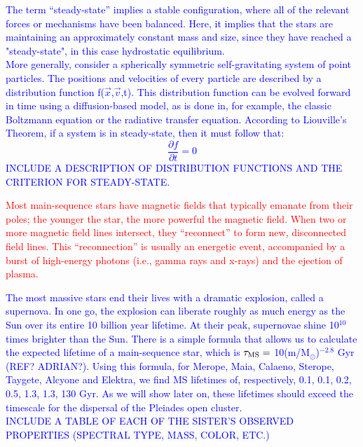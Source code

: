 \documentclass[main.tex]{subfiles}
\begin{document}
\begin{tcolorbox}[sharp corners, colback=blue!30, colframe=blue!80!blue, title=Steady-State$^{20}$]
\par \textcolor{blue} {The term ``steady-state'' implies a stable configuration, where all of the relevant forces or mechanisms have been balanced.  Here, it implies that the stars are maintaining an approximately constant mass and size, since they have reached a "steady-state", in this case hydrostatic equilibrium. \\
More generally, consider a spherically symmetric self-gravitating system of point particles.  The positions and velocities of every particle are described by a distribution function f($\vec{x}$,$\vec{v}$,t).  This distribution function can be evolved forward in time using a diffusion-based model, as is done in, for example, the classic Boltzmann equation or the radiative transfer equation.  According to Liouville's Theorem, if a system is in steady-state, then it must follow that:
\begin{equation}
\label{eqn:steadystate}
\frac{{\partial}f}{{\partial}t} = 0
\end{equation}
INCLUDE A DESCRIPTION OF DISTRIBUTION FUNCTIONS AND THE CRITERION FOR STEADY-STATE.} 
\end{tcolorbox}

\begin{tcolorbox}[sharp corners, colback=red!30, colframe=red!80!blue, title=Reconnection of Magnetic Field Lines$^{21}$]
\par \textcolor{red} {Most main-sequence stars have magnetic fields that typically emanate from their poles; the younger the star, the more powerful the magnetic field.  When two or more magnetic field lines intersect, they ``reconnect'' to form new, disconnected field lines.  This ``reconnection'' is usually an energetic event, accompanied by a burst of high-energy photons (i.e., gamma rays and x-rays) and the ejection of plasma.}   
\end{tcolorbox}

\begin{tcolorbox}[sharp corners, colback=blue!30, colframe=blue!80!blue, title=Supernovae and Stellar Lifetimes$^{22}$]
\par \textcolor{blue} {\nar The most massive stars end their lives with a dramatic explosion, called a supernova.  In one go, the explosion can liberate roughly as much energy as the Sun over its entire 10 billion year lifetime.  At their peak, supernovae shine 10$^{10}$ times brighter than the Sun.  There is a simple formula that allows us to calculate the expected lifetime of a main-sequence star, which is $\tau_{\rm MS} =$ 10(m/M$_{\odot}$)$^{-2.8}$ Gyr (REF? ADRIAN?).  Using this formula, for Merope, Maia, Calaeno, Sterope, Taygete, Alcyone and Elektra, we find MS lifetimes of, respectively, 0.1, 0.1, 0.2, 0.5, 1.3, 1.3, 130 Gyr.  As we will show later on, these lifetimes should exceed the timescale for the dispersal of the Pleiades open cluster. \\
INCLUDE A TABLE OF EACH OF THE SISTER'S OBSERVED PROPERTIES (SPECTRAL TYPE, MASS, COLOR, ETC.)}
\end{tcolorbox}
\end{document}
